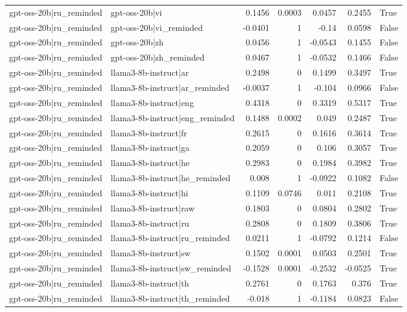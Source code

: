 \begin{table}
\begin{tabular}{l l r r r r l}
gpt-oss-20b|ru_reminded & gpt-oss-20b|vi & 0.1456 & 0.0003 & 0.0457 & 0.2455 & True \\
gpt-oss-20b|ru_reminded & gpt-oss-20b|vi_reminded & -0.0401 & 1 & -0.14 & 0.0598 & False \\
gpt-oss-20b|ru_reminded & gpt-oss-20b|zh & 0.0456 & 1 & -0.0543 & 0.1455 & False \\
gpt-oss-20b|ru_reminded & gpt-oss-20b|zh_reminded & 0.0467 & 1 & -0.0532 & 0.1466 & False \\
gpt-oss-20b|ru_reminded & llama3-8b-instruct|ar & 0.2498 & 0 & 0.1499 & 0.3497 & True \\
gpt-oss-20b|ru_reminded & llama3-8b-instruct|ar_reminded & -0.0037 & 1 & -0.104 & 0.0966 & False \\
gpt-oss-20b|ru_reminded & llama3-8b-instruct|eng & 0.4318 & 0 & 0.3319 & 0.5317 & True \\
gpt-oss-20b|ru_reminded & llama3-8b-instruct|eng_reminded & 0.1488 & 0.0002 & 0.049 & 0.2487 & True \\
gpt-oss-20b|ru_reminded & llama3-8b-instruct|fr & 0.2615 & 0 & 0.1616 & 0.3614 & True \\
gpt-oss-20b|ru_reminded & llama3-8b-instruct|ga & 0.2059 & 0 & 0.106 & 0.3057 & True \\
gpt-oss-20b|ru_reminded & llama3-8b-instruct|he & 0.2983 & 0 & 0.1984 & 0.3982 & True \\
gpt-oss-20b|ru_reminded & llama3-8b-instruct|he_reminded & 0.008 & 1 & -0.0922 & 0.1082 & False \\
gpt-oss-20b|ru_reminded & llama3-8b-instruct|hi & 0.1109 & 0.0746 & 0.011 & 0.2108 & True \\
gpt-oss-20b|ru_reminded & llama3-8b-instruct|raw & 0.1803 & 0 & 0.0804 & 0.2802 & True \\
gpt-oss-20b|ru_reminded & llama3-8b-instruct|ru & 0.2808 & 0 & 0.1809 & 0.3806 & True \\
gpt-oss-20b|ru_reminded & llama3-8b-instruct|ru_reminded & 0.0211 & 1 & -0.0792 & 0.1214 & False \\
gpt-oss-20b|ru_reminded & llama3-8b-instruct|sw & 0.1502 & 0.0001 & 0.0503 & 0.2501 & True \\
gpt-oss-20b|ru_reminded & llama3-8b-instruct|sw_reminded & -0.1528 & 0.0001 & -0.2532 & -0.0525 & True \\
gpt-oss-20b|ru_reminded & llama3-8b-instruct|th & 0.2761 & 0 & 0.1763 & 0.376 & True \\
gpt-oss-20b|ru_reminded & llama3-8b-instruct|th_reminded & -0.018 & 1 & -0.1184 & 0.0823 & False \\

\end{tabular}
\end{table}
